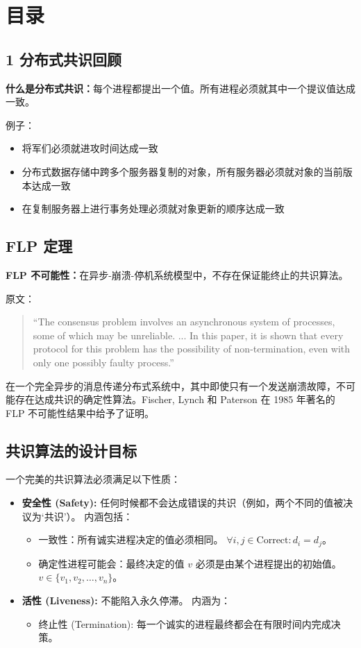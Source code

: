 \section*{目录}

\subsection{1 分布式共识回顾}

\textbf{什么是分布式共识：}每个进程都提出一个值。所有进程必须就其中一个提议值达成一致。

例子：
\begin{itemize}
\item 将军们必须就进攻时间达成一致
\item 分布式数据存储中跨多个服务器复制的对象，所有服务器必须就对象的当前版本达成一致
\item 在复制服务器上进行事务处理必须就对象更新的顺序达成一致
\end{itemize}

\subsection{FLP 定理}

\textbf{FLP 不可能性：}在异步-崩溃-停机系统模型中，不存在保证能终止的共识算法。

原文：
\begin{quote}
``The consensus problem involves an asynchronous system of processes, some of which may be unreliable. ... In this paper, it is shown that every protocol for this problem has the possibility of non-termination, even with only one possibly faulty process.''
\end{quote}
在一个完全异步的消息传递分布式系统中，其中即使只有一个发送崩溃故障，不可能存在达成共识的确定性算法。Fischer, Lynch 和 Paterson 在 1985 年著名的 FLP 不可能性结果中给予了证明。

\subsection{共识算法的设计目标}

一个完美的共识算法必须满足以下性质：
\begin{itemize}
\item \textbf{安全性 (Safety):} 任何时候都不会达成错误的共识（例如，两个不同的值被决议为‘共识’）。
  内涵包括：
  \begin{itemize}
  \item 一致性：所有诚实进程决定的值必须相同。 $\forall i, j \in \text{Correct}: d_i = d_j$。
  \item 确定性进程可能会：最终决定的值 $v$ 必须是由某个进程提出的初始值。 $v \in \{v_1, v_2, \dots, v_n\}$。
  \end{itemize}
\item \textbf{活性 (Liveness):} 不能陷入永久停滞。
  内涵为：
  \begin{itemize}
  \item 终止性 (Termination): 每一个诚实的进程最终都会在有限时间内完成决策。
  \end{itemize}
\end{itemize}

